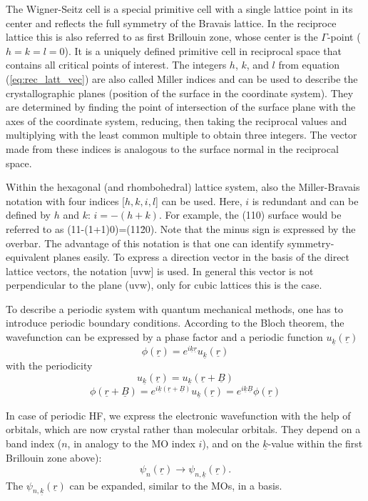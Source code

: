 \documentclass[11pt,DIV=13,BCOR=5mm,a4paper,headinclude]{scrbook}
\renewcommand{\vec}[1]{\underline{#1}}
\begin{document}
The Wigner-Seitz cell is a special primitive cell with a single lattice point in its center and reflects the full symmetry of the Bravais lattice.
In the reciproce lattice this is also referred to as first Brillouin zone, whose center is the $\Gamma$-point ($h=k=l=0$).
It is a uniquely defined primitive cell in reciprocal space that contains all critical points of interest.
The integers $h$, $k$, and $l$ from equation (\ref{eq:rec_latt_vec}) are also called Miller indices and can be used to describe the crystallographic planes (position of the surface in the coordinate system).
They are determined by finding the point of intersection of the surface plane with the axes of the coordinate system, reducing, then taking the reciprocal values and multiplying with the least common multiple to obtain three integers.
The vector made from these indices is analogous to the surface normal in the reciprocal space.


Within the hexagonal (and rhombohedral) lattice system, also the Miller-Bravais notation with four indices [$h,k,i,l$] can be used.
Here, $i$ is redundant and can be defined by $h$ and $k$: $i=-(h+k)$.
For example, the (110) surface would be referred to as (11-(1+1)0)=(11\=20).
Note that the minus sign is expressed by the overbar.
The advantage of this notation is that one can identify symmetry-equivalent planes easily.
To express a direction vector in the basis of the direct lattice vectors, the notation [uvw] is used.
In general this vector is not perpendicular to the plane (uvw), only for cubic lattices this is the case.


To describe a periodic system with quantum mechanical methods, one has to introduce periodic boundary conditions.
According to the Bloch theorem\cite{Bloch1928}, the wavefunction can be expressed by a phase factor and a periodic function $u_{\vec{k}}(\vec{r})$
\begin{equation}
\phi(\vec{r})=e^{i\vec{k}\vec{r}}u_{\vec{k}}(\vec{r})
\end{equation}
with the periodicity
\begin{equation}
u_{\vec{k}}(\vec{r})=u_{\vec{k}}(\vec{r}+\vec{B})
\end{equation}
\begin{equation}
\phi(\vec{r}+\vec{B})=e^{i\vec{k}(\vec{r}+\vec{B})}u_{\vec{k}}(\vec{r})=e^{i\vec{k}\vec{B}}\phi(\vec{r})
\end{equation}

In case of periodic HF, we express the electronic wavefunction with the help of orbitals, which are now crystal rather than molecular orbitals.
They depend on a band index ($n$, in analogy to the MO index $i$), and on the $\vec{k}$-value within the first Brillouin zone above):
\begin{equation}
 \psi_n(\vec{r})\rightarrow\psi_{n,\vec{k}}(\vec{r}).
\end{equation}
The $\psi_{n,\vec{k}}(\vec{r})$ can be expanded, similar to the MOs, in a basis.
\end{document}
